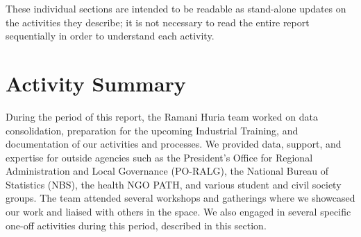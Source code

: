 \documentclass[a4paper,12pt,twoside]{article}
\begin{document}
These individual sections are intended to be readable as stand-alone updates on the activities they describe; it is not necessary to read the entire report sequentially in order to understand each activity.

\newpage
\section{Activity Summary}

During the period of this report, the Ramani Huria team worked on data consolidation, preparation for the upcoming Industrial Training, and documentation of our activities and processes. We provided data, support, and expertise for outside agencies such as the President's Office for Regional Administration and Local Governance (PO-RALG), the National Bureau of Statistics (NBS), the health NGO PATH, and various student and civil society groups. The team attended several workshops and gatherings where we showcased our work and liaised with others in the space. We also engaged in several specific one-off activities during this period, described in this section.
\end{document}
